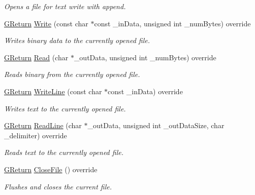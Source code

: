 \begin{DoxyCompactItemize}
\begin{DoxyCompactList}\small\item\em Opens a file for text write with append. \end{DoxyCompactList}\item 
\hyperlink{namespaceGW_a67a839e3df7ea8a5c5686613a7a3de21}{G\+Return} \hyperlink{classFileIO_a6d849348b4255304b9a1c0c2bd4cd231}{Write} (const char $\ast$const \+\_\+in\+Data, unsigned int \+\_\+num\+Bytes) override
\begin{DoxyCompactList}\small\item\em Writes binary data to the currently opened file. \end{DoxyCompactList}\item 
\hyperlink{namespaceGW_a67a839e3df7ea8a5c5686613a7a3de21}{G\+Return} \hyperlink{classFileIO_adb5270ace70c0189525a7c21c5be31b9}{Read} (char $\ast$\+\_\+out\+Data, unsigned int \+\_\+num\+Bytes) override
\begin{DoxyCompactList}\small\item\em Reads binary from the currently opened file. \end{DoxyCompactList}\item 
\hyperlink{namespaceGW_a67a839e3df7ea8a5c5686613a7a3de21}{G\+Return} \hyperlink{classFileIO_af76c68078333756f887d7298fe9c3492}{Write\+Line} (const char $\ast$const \+\_\+in\+Data) override
\begin{DoxyCompactList}\small\item\em Writes text to the currently opened file. \end{DoxyCompactList}\item 
\hyperlink{namespaceGW_a67a839e3df7ea8a5c5686613a7a3de21}{G\+Return} \hyperlink{classFileIO_a2178a711eb984539cefe6d651a7167fb}{Read\+Line} (char $\ast$\+\_\+out\+Data, unsigned int \+\_\+out\+Data\+Size, char \+\_\+delimiter) override
\begin{DoxyCompactList}\small\item\em Reads text to the currently opened file. \end{DoxyCompactList}\item 
\hyperlink{namespaceGW_a67a839e3df7ea8a5c5686613a7a3de21}{G\+Return} \hyperlink{classFileIO_a906610c8653ba8ca476dc46679851590}{Close\+File} () override
\begin{DoxyCompactList}\small\item\em Flushes and closes the current file. \end{DoxyCompactList}\item 

\end{DoxyCompactItemize}
